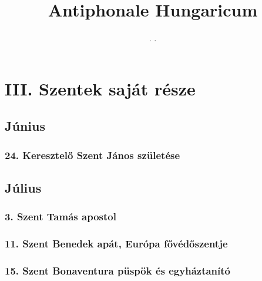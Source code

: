 \documentclass[twoside]{article}
\title{Antiphonale Hungaricum}
\subtitle{\the\year. \the\month.}
\begin{document}
\section*{III. Szentek saját része}
\setcounter{page}{1}
    \subsection*{Június}
        \subsubsection*{24. Keresztelő Szent János születése}
            \begin{gregosheet}
            \end{gregosheet}
    \subsection*{Július}
        \subsubsection*{3. Szent Tamás apostol}
            \begin{gregosheet}
            \end{gregosheet}
        \subsubsection*{11. Szent Benedek apát, Európa fővédőszentje}
            \begin{gregosheet}
            \end{gregosheet}
        \subsubsection*{15. Szent Bonaventura püspök és egyháztanító}
            \begin{gregosheet}
            \end{gregosheet}
\end{document}
